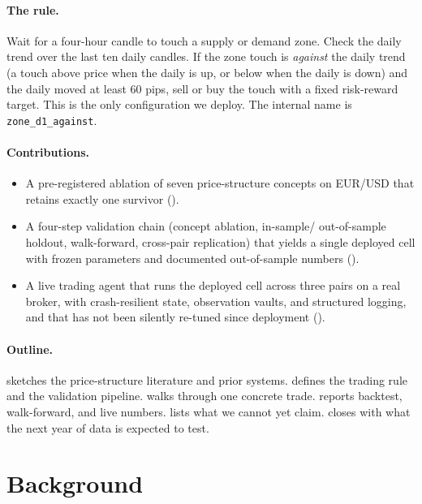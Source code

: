 \documentclass[11pt,a4paper]{article}
\begin{document}
\paragraph{The rule.} Wait for a four-hour candle to touch a supply or
demand zone. Check the daily trend over the last ten daily candles. If the
zone touch is \emph{against} the daily trend (a touch above price when the
daily is up, or below when the daily is down) and the daily moved at
least 60 pips, sell or buy the touch with a fixed risk-reward target.
This is the only configuration we deploy. The internal name is
\texttt{zone\_d1\_against}.

\paragraph{Contributions.} 
\begin{itemize}
  \item A pre-registered ablation of seven price-structure concepts on
        EUR/USD that retains exactly one survivor ().
  \item A four-step validation chain (concept ablation, in-sample/
        out-of-sample holdout, walk-forward, cross-pair replication) that
        yields a single deployed cell with frozen parameters and
        documented out-of-sample numbers ().
  \item A live trading agent that runs the deployed cell across three
        pairs on a real broker, with crash-resilient state, observation
        vaults, and structured logging, and that has not been silently
        re-tuned since deployment ().
\end{itemize}

\paragraph{Outline.}  sketches the price-structure
literature and prior systems.  defines the trading rule
and the validation pipeline.  walks through one concrete
trade.  reports backtest, walk-forward, and live
numbers.  lists what we cannot yet claim.
 closes with what the next year of data is expected
to test.

\section{Background}\label{sec:background}
\end{document}
